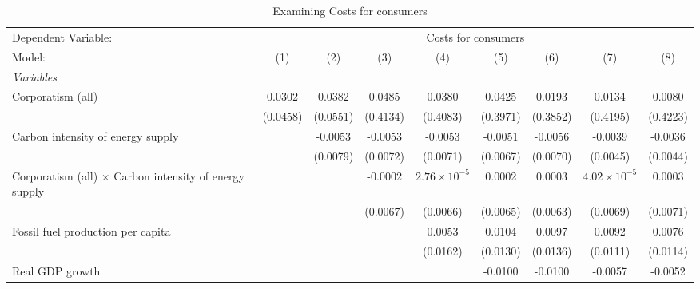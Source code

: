 
\begin{table}[htbp]
   \caption{Examining Costs for consumers}
   \centering
   \begin{tabular}{lcccccccc}
      \tabularnewline \midrule \midrule
      Dependent Variable: & \multicolumn{8}{c}{Costs for consumers}\\
      Model:                                                        & (1)      & (2)      & (3)      & (4)                   & (5)      & (6)      & (7)                   & (8)\\  
      \midrule
      \emph{Variables}\\
      Corporatism (all)                                             & 0.0302   & 0.0382   & 0.0485   & 0.0380                & 0.0425   & 0.0193   & 0.0134                & 0.0080\\   
                                                                    & (0.0458) & (0.0551) & (0.4134) & (0.4083)              & (0.3971) & (0.3852) & (0.4195)              & (0.4223)\\   
      Carbon intensity of energy supply                             &          & -0.0053  & -0.0053  & -0.0053               & -0.0051  & -0.0056  & -0.0039               & -0.0036\\   
                                                                    &          & (0.0079) & (0.0072) & (0.0071)              & (0.0067) & (0.0070) & (0.0045)              & (0.0044)\\   
      Corporatism (all) $\times$ Carbon intensity of energy supply  &          &          & -0.0002  & $2.76\times 10^{-5}$  & 0.0002   & 0.0003   & $4.02\times 10^{-5}$  & 0.0003\\   
                                                                    &          &          & (0.0067) & (0.0066)              & (0.0065) & (0.0063) & (0.0069)              & (0.0071)\\   
      Fossil fuel production per capita                             &          &          &          & 0.0053                & 0.0104   & 0.0097   & 0.0092                & 0.0076\\   
                                                                    &          &          &          & (0.0162)              & (0.0130) & (0.0136) & (0.0111)              & (0.0114)\\   
      Real GDP growth                                               &          &          &          &                       & -0.0100  & -0.0100  & -0.0057               & -0.0052\\   

\end{tabular}
\end{table}
